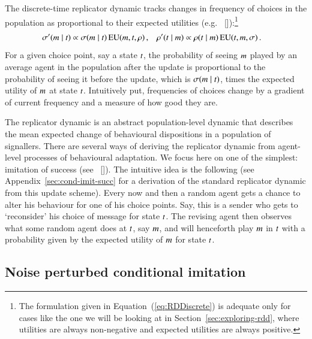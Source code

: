 \documentclass[12pt,english]{article}
\numberwithin{equation}{section}
\newcommand{\citepbjpspre}[2]{(#1~\citeauthor{#2} [\citeyear{#2}])}
\begin{document}
The discrete-time replicator dynamic tracks changes in frequency of choices in the population
as proportional to their expected utilities
\citepbjpspre{e.g.}{HofbauerSigmund1998:Evolutionary-Ga}:\footnote{The formulation given in
  Equation~(\ref{eq:RDDiscrete}) is adequate only for cases like the one we will be looking at
  in Section~\ref{sec:exploring-rdd}, where utilities are always non-negative and expected
  utilities are always positive.}
\begin{align}
  \label{eq:RDDiscrete}
  \sigma'(m \mid t) & \propto \sigma(m \mid t) \thinspace
    \mathrm{EU}(m, t,\rho)\,, & \rho'(t \mid m) & \propto \rho(t \mid m) \thinspace
    \mathrm{EU}(t, m,\sigma)\,.   
\end{align}
For a given choice point, say a state $t$, the probability of seeing $m$ played by an
average agent in the population after the update is proportional to the probability of
seeing it before the update, which is $\sigma(m \mid t)$, times the
expected utility of $m$ at state $t$. Intuitively put, frequencies of choices change
by a gradient of current frequency and a measure of how good they are.

The replicator dynamic is an abstract population-level dynamic that describes the mean expected
change of behavioural dispositions in a population of signallers. There are several ways of
deriving the replicator dynamic from agent-level processes of behavioural adaptation. We focus
here on one of the simplest: imitation of success
\citepbjpspre{see}{Sandholm2010:Population-Game}. The intuitive idea is the following (see
Appendix~\ref{sec:cond-imit-succ} for a derivation of the standard replicator dynamic from this
update scheme).  Every now and then a random agent gets a chance to alter his behaviour for one
of his choice points. Say, this is a sender who gets to `reconsider' his choice of message
for state $t$. The revising agent then observes what some random agent does at $t$,
say $m$, and will henceforth play $m$ in $t$ with a probability given by the
expected utility of $m$ for state $t$.

\subsection{Noise perturbed conditional imitation}
\label{sec:noisy-repl-dynam}
\end{document}

